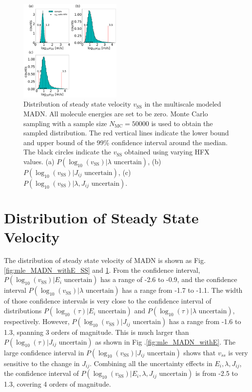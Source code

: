 \documentclass[%
 reprint,
superscriptaddress,
 amsmath,amssymb,
 aps,
prb,
floatfix
]{revtex4-2}
\begin{document}
\begin{figure}
  \centering
  \includegraphics[width=0.45\textwidth]{figs/fig_mle_MADN_noE_SS.pdf}
  \caption{Distribution of steady state velocity $v_\text{SS}$ in the multiscale modeled MADN. All molecule energies are set to be zero.  
  Monte Carlo sampling with a sample size $N_\text{MC}=50000$ is used to obtain the sampled distribution.
  The red vertical lines indicate the lower bound and upper bound of the 99\% confidence interval around the median.
  The black circles indicate the $v_\text{SS}$ obtained using varying HFX values.
  (a) $P(\log_{10}(v_\text{SS})|\lambda \text{ uncertain})$, 
  (b) $P(\log_{10}(v_\text{SS})|J_{ij} \text{ uncertain})$, 
  (c) $P(\log_{10}(v_\text{SS})|\lambda, J_{ij} \text{ uncertain})$.  }
  \label{fig:mle_MADN_noE_SS}
\end{figure}
%
\section{Distribution of Steady State Velocity}

The distribution of steady state velocity of MADN is shown as Fig.\ref{fig:mle_MADN_withE_SS} and \ref{fig:mle_MADN_noE_SS}. 
From the confidence interval, $P(\log_{10}(v_\text{SS})|E_i \text{ uncertain})$ has a range of -2.6 to -0.9, and the confidence interval $P(\log_{10}(v_\text{SS})|\lambda \text{ uncertain})$ has a range from -1.7 to -1.1. The width of those confidence intervals is very close to the confidence interval of distributions $P(\log_{10}(\tau)|E_i \text{ uncertain})$ and $P(\log_{10}(\tau)|\lambda \text{ uncertain})$, respectively.
However, $P(\log_{10}(v_\text{SS})|J_{ij} \text{ uncertain})$ has a range from -1.6 to 1.3, spanning 3 orders of magnitude. This is  much larger than $P(\log_{10}(\tau)|J_{ij} \text{ uncertain})$ as shown in Fig .\ref{fig:mle_MADN_withE}.  
The large confidence interval in $P(\log_{10}(v_\text{SS})|J_{ij} \text{ uncertain})$ shows that $v_{ss}$ is very sensitive to the change in $J_{ij}$. Combining all the uncertainty effects in $E_i, \lambda, J_{ij}$, the confidence interval of $P(\log_{10}(v_\text{SS})|E_i, \lambda, J_{ij} \text{ uncertain})$ is from -2.5 to 1.3, covering 4 orders of magnitude.  
\end{document}
